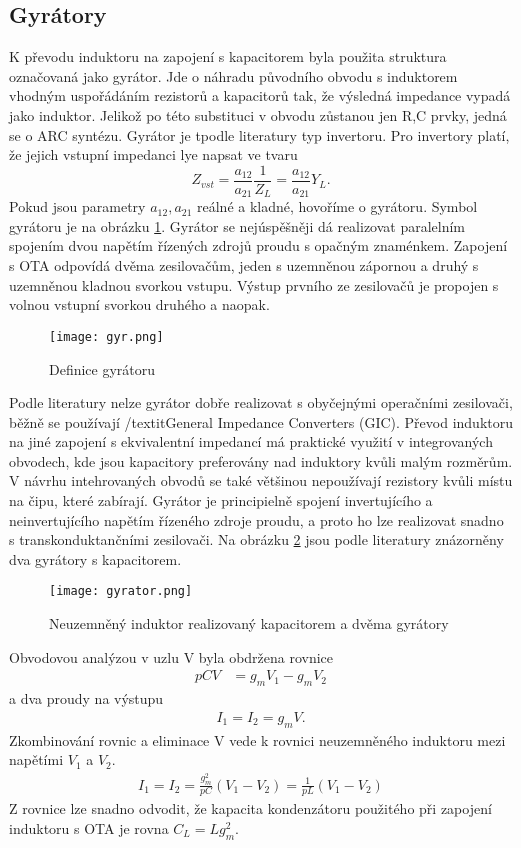 \subsection{Gyrátory}\label{s:GYR}
\noindent K převodu induktoru na zapojení s kapacitorem byla použita struktura označovaná jako gyrátor. Jde o náhradu původního obvodu s induktorem vhodným uspořádáním rezistorů a kapacitorů tak, že výsledná impedance vypadá jako induktor. Jelikož po této substituci v obvodu zůstanou jen R,C prvky, jedná se o ARC syntézu.  Gyrátor je tpodle literatury \cite{10} typ invertoru. Pro invertory platí, že jejich vstupní impedanci lye napsat ve tvaru\begin{equation}
Z_{vst} = \frac{a_{12}}{a_{21}}\frac{1}{Z_L} = \frac{a_{12}}{a_{21}}Y_L.
\end{equation}
Pokud jsou parametry $a_{12}, a_{21}$ reálné a kladné, hovoříme o gyrátoru. Symbol gyrátoru je na obrázku \ref{s:G}. Gyrátor se nejúspěšněji dá realizovat paralelním spojením dvou napětím řízených zdrojů proudu s opačným znaménkem. Zapojení s OTA odpovídá dvěma zesilovačům, jeden s uzemněnou zápornou a druhý s uzemněnou kladnou svorkou vstupu. Výstup prvního ze zesilovačů je propojen s volnou vstupní svorkou druhého a naopak.
\begin{figure}[h]
\centering
\texttt{[image: gyr.png]}
\caption{Definice gyrátoru \label{s:G}}
\end{figure}
Podle literatury \cite{18} nelze gyrátor dobře realizovat s obyčejnými operačními zesilovači, běžně se používají /textit{General Impedance Converters (GIC)}. Převod induktoru na jiné zapojení s ekvivalentní impedancí má praktické využití v integrovaných obvodech, kde jsou kapacitory preferovány nad induktory kvůli malým rozměrům. V návrhu intehrovaných obvodů se také většinou nepoužívají rezistory kvůli místu na čipu, které zabírají. Gyrátor je principielně spojení invertujícího a neinvertujícího napětím řízeného zdroje proudu, a proto ho lze realizovat snadno s transkonduktančními zesilovači. Na obrázku \ref{s:GO} jsou podle literatury \cite{18} znázorněny dva gyrátory s kapacitorem. 
\begin{figure}[h]
\centering
\texttt{[image: gyrator.png]}
\caption[Neuzemněný induktor realizovaný kapacitorem a dvěma gyrátory]{Neuzemněný induktor realizovaný kapacitorem a dvěma gyrátory \label{s:GO}}
\end{figure}
Obvodovou analýzou v uzlu V byla obdržena rovnice
\begin{align}
pCV &= g_mV_1 - g_mV_2
\end{align}
a dva proudy na výstupu
\begin{align}
I_1 = I_2 = g_mV.
\end{align}
Zkombinování rovnic a eliminace V vede k rovnici neuzemněného induktoru mezi napětími $V_1$ a $V_2$.
\begin{align}
I_1 = I_2 = \frac{g_m^2}{pC}(V_1 - V_2) = \frac{1}{pL}(V_1 - V_2)
\end{align}
Z rovnice lze snadno odvodit, že kapacita kondenzátoru použitého při zapojení induktoru s OTA je rovna $C_L = L g_m ^2$. \\
